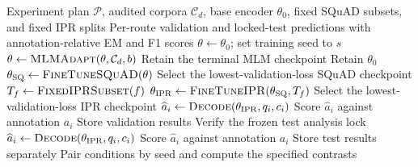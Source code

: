\documentclass[pdflatex,sn-basic]{sn-jnl}
\begin{document}
\begin{algorithm}[!htbp]
\caption{Audited DAPT and reader evaluation procedure}
\label{alg:dapt}
\begin{algorithmic}[1]
\Require Experiment plan \(\mathcal{P}\), audited corpora \(\mathcal{C}_d\),
base encoder \(\theta_0\), fixed SQuAD subsets, and fixed IPR splits
\Ensure Per-route validation and locked-test predictions with
annotation-relative EM and F1 scores
    \State \(\theta\gets\theta_0\); set training seed to \(s\)
        \State \(\theta\gets\Call{MLMAdapt}{\theta,\mathcal{C}_d,b}\)
        \State Retain the terminal MLM checkpoint
    \Else
        \State Retain \(\theta_0\)
    \EndIf
    \State \(\theta_{\mathrm{SQ}}\gets\Call{FineTuneSQuAD}{\theta}\)
    \State Select the lowest-validation-loss SQuAD checkpoint
    \State \(T_f\gets\Call{FixedIPRSubset}{f}\)
    \State \(\theta_{\mathrm{IPR}}\gets
    \Call{FineTuneIPR}{\theta_{\mathrm{SQ}},T_f}\)
    \State Select the lowest-validation-loss IPR checkpoint
        \State \(\widehat{a}_i\gets
        \Call{Decode}{\theta_{\mathrm{IPR}},q_i,c_i}\)
        \State Score \(\widehat{a}_i\) against annotation \(a_i\)
    \EndFor
    \State Store validation results
    \State Verify the frozen test analysis lock
        \State \(\widehat{a}_i\gets
        \Call{Decode}{\theta_{\mathrm{IPR}},q_i,c_i}\)
        \State Score \(\widehat{a}_i\) against annotation \(a_i\)
    \EndFor
    \State Store test results separately
\EndFor
\State Pair conditions by seed and compute the specified contrasts
\end{algorithmic}
\end{algorithm}
\end{document}
